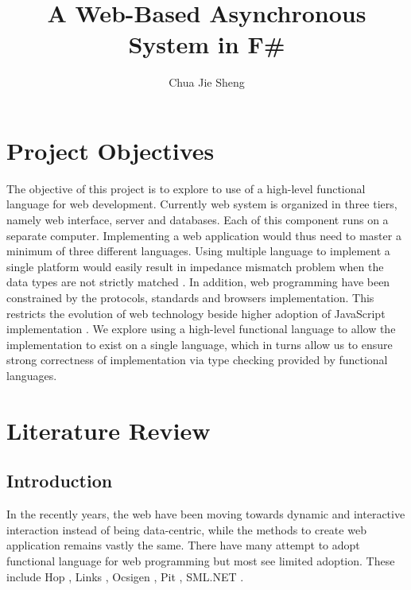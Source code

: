 \documentclass[12pt,fullpage]{article}
\begin{document}
\title{A Web-Based Asynchronous System in F\#}
\author{Chua Jie Sheng}
\maketitle

\section{Project Objectives}
The objective of this project is to explore to use of a high-level functional
language for web development. Currently web system is organized in three tiers,
namely web interface, server and databases. Each of this component runs on a
separate computer. Implementing a web application would thus need to master a
minimum of three different languages. Using multiple language to implement a
single platform would easily result in impedance mismatch problem when the data
types are not strictly matched \parencite{links06}. In addition, web programming
have been constrained by the protocols, standards and browsers implementation.
This restricts the evolution of web technology beside higher adoption of
JavaScript implementation \parencite{balat09}. We explore using a high-level
functional language to allow the implementation to exist on a single language,
which in turns allow us to ensure strong correctness of implementation
via type checking provided by functional languages.

\section{Literature Review}
\subsection{Introduction}
In the recently years, the web have been moving towards dynamic and interactive
interaction instead of being data-centric, while the methods to create web
application remains vastly the same. There have many attempt to adopt functional
language for web programming but most see limited adoption. These include
Hop \parencite{serrano07}, Links \parencite{links06}, Ocsigen \parencite{balat06},
Pit \parencite{paper4}, SML.NET \parencite{benton04}.
\end{document}
